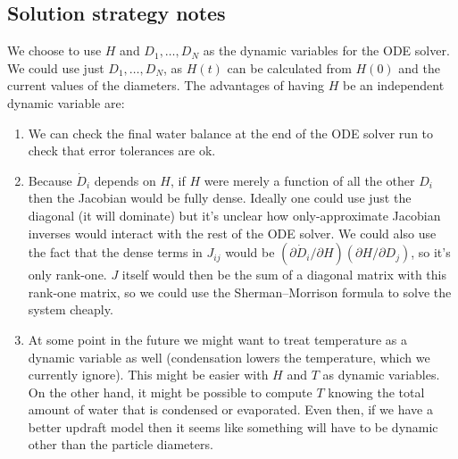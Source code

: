 \documentclass{article}
\begin{document}
\newpage

\subsection*{Solution strategy notes}

We choose to use $H$ and $D_1,\ldots,D_N$ as the dynamic variables for
the ODE solver. We could use just $D_1,\ldots,D_N$, as $H(t)$ can be
calculated from $H(0)$ and the current values of the diameters. The
advantages of having $H$ be an independent dynamic variable are:
\begin{enumerate}
\item We can check the final water balance at the end of the ODE
  solver run to check that error tolerances are ok.
\item Because $\dot{D}_i$ depends on $H$, if $H$ were merely a
  function of all the other $D_i$ then the Jacobian would be fully
  dense. Ideally one could use just the diagonal (it will dominate)
  but it's unclear how only-approximate Jacobian inverses would
  interact with the rest of the ODE solver. We could also use the fact
  that the dense terms in $J_{ij}$ would be $(\partial \dot{D}_i
  / \partial H) (\partial H / \partial D_j)$, so it's only
  rank-one. $J$ itself would then be the sum of a diagonal matrix with
  this rank-one matrix, so we could use the Sherman–Morrison formula
  to solve the system cheaply.
\item At some point in the future we might want to treat temperature
  as a dynamic variable as well (condensation lowers the temperature,
  which we currently ignore). This might be easier with $H$ and $T$ as
  dynamic variables. On the other hand, it might be possible to
  compute $T$ knowing the total amount of water that is condensed or
  evaporated. Even then, if we have a better updraft model then it
  seems like something will have to be dynamic other than the particle
  diameters.
\end{enumerate}
\end{document}
